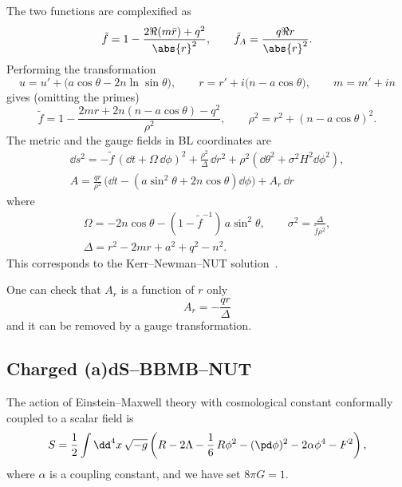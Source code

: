 The two functions are complexified as
\begin{equation}
	\tilde f = 1 - \frac{2 \Re(m \bar r) + q^2}{\abs{r}^2}, \qquad
	\tilde f_A = \frac{q \Re r}{\abs{r}^2}.
\end{equation} 
Performing the transformation
\begin{equation}
	u = u' + \big( a \cos\theta - 2 n \ln \sin\theta \big), \qquad
	r = r' + i \big( n - a \cos\theta \big), \qquad
	m = m' + i n
\end{equation} 
gives (omitting the primes)
\begin{equation}
	\tilde f = 1 - \frac{2 m r + 2 n ( n - a \cos\theta) - q^2}{\rho^2}, \qquad
	\rho^2 = r^2 + (n - a \cos\theta)^2.
\end{equation}
The metric and the gauge fields in BL coordinates are
\begin{subequations}
\begin{gather}
	\dd s^2 = - \tilde f\, (\dd t + \Omega\, \dd\phi )^2
		+ \frac{\rho^2}{\Delta}\, \dd r^2
		+ \rho^2 (\dd\theta^2 + \sigma^2 H^2 \dd\phi^2), \\
	A = \frac{q r}{\rho^2}\, \Big( \dd t - (a \sin^2 \theta + 2 n \cos \theta) \dd \phi \Big) + A_r\, \dd r
\end{gather}
\end{subequations}
where
\begin{equation}
	\begin{gathered}
		\Omega = - 2 n \cos \theta - (1 - \tilde f^{-1})\, a \sin^2 \theta, \qquad
		\sigma^2 = \frac{\Delta}{\tilde f \rho^2}, \\
		\Delta = r^2 - 2 m r + a^2 + q^2 - n^2.
	\end{gathered}
\end{equation} 
This corresponds to the Kerr--Newman--NUT solution~\cite{AlonsoAlberca:2000:SupersymmetryTopologicalKerrNewmannTaubNUTaDS}.

One can check that $A_r$ is a function of $r$ only
\begin{equation}
	A_r = - \frac{q r}{\Delta}
\end{equation} 
and it can be removed by a gauge transformation.


\subsection{Charged (a)dS--BBMB--NUT}
\label{sec:examples:bbmb}


The action of Einstein--Maxwell theory with cosmological constant conformally coupled to a scalar field is~\cite{Bardoux:2013:IntegrabilityConformallyCoupled}
\begin{equation}
	S = \frac{1}{2} \int \dd^4 x\, \sqrt{-g} \left( R - 2 \Lambda - \frac{1}{6}\, R \phi^2 - (\pd \phi)^2 - 2 \alpha \phi^4 - F^2 \right),
\end{equation} 
where $\alpha$ is a coupling constant, and we have set $8\pi G = 1$.

